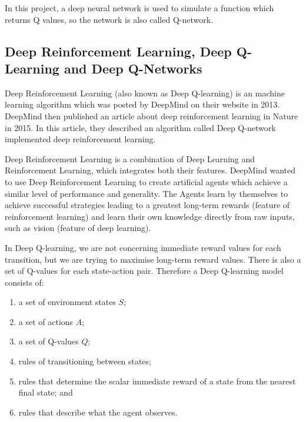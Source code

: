 \documentclass[a4paper]{article}
\begin{document}
            In this project, a deep neural network is used to simulate a function which returns Q values\cite{human-level}, so the network is also called Q-network.
            
            
            
            
            
            
            
            
            
        
        
        
        \subsection{Deep Reinforcement Learning, Deep Q-Learning and Deep Q-Networks}
        
            Deep Reinforcement Learning (also known as Deep Q-learning) is an 
            machine learning algorithm which was posted by DeepMind on their 
            website in 2013. \cite{Deep-RL} DeepMind then published an article about deep 
            reinforcement learning in Nature in 2015. \cite{human-level} In this article, they described
            an algorithm called Deep Q-network implemented deep reinforcement learning.
            
            Deep Reinforcement Learning is a combination of Deep Learning
            and Reinforcement Learning, which integrates both their features. 
            DeepMind wanted to use Deep Reinforcement Learning to create artificial
            agents which achieve a similar level of performance and generality.
            The Agents learn by themselves to achieve successful strategies leading
            to a greatest long-term rewards (feature of reinforcement learning) and
            learn their own knowledge directly from raw inputs, such as vision 
            (feature of deep learning). \cite{DQN}
            
            In Deep Q-learning, we are not concerning immediate reward values for each transition,
            but we are trying to maximise long-term reward values. There is also a set of Q-values for each state-action pair. Therefore a Deep Q-learning model
            consists of:
            \begin{enumerate}[leftmargin=1.5cm]
                \item a set of environment states $S$;
                \item a set of actions $A$;
                \item a set of Q-values $Q$;
                \item rules of transitioning between states;
                \item rules that determine the scalar immediate reward
                of a state from the nearest final state; and
                \item rules that describe what the agent observes.
            \end{enumerate}
            
\end{document}
